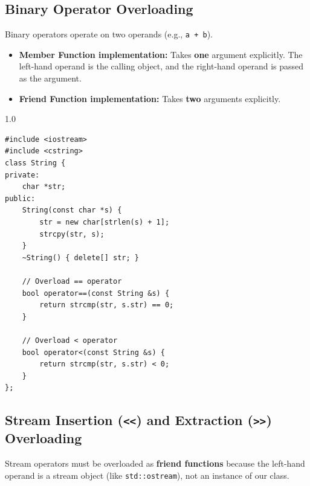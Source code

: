 \documentclass[12pt,a4paper]{article}
\begin{document}
\subsection{Binary Operator Overloading}
Binary operators operate on two operands (e.g., \texttt{a + b}).
\begin{itemize}[leftmargin=*, itemsep=3pt]
  \item \textbf{Member Function implementation:} Takes \textbf{one} argument explicitly. The left-hand operand is the calling object, and the right-hand operand is passed as the argument.
  \item \textbf{Friend Function implementation:} Takes \textbf{two} arguments explicitly.
\end{itemize}

\begin{tcolorbox}[examplebox, title={Code Example: Relational operator overloading for custom strings}]
\begin{spacing}{1.0}
\begin{verbatim}
#include <iostream>
#include <cstring>
class String {
private:
    char *str;
public:
    String(const char *s) {
        str = new char[strlen(s) + 1];
        strcpy(str, s);
    }
    ~String() { delete[] str; }
    
    // Overload == operator
    bool operator==(const String &s) {
        return strcmp(str, s.str) == 0;
    }
    
    // Overload < operator
    bool operator<(const String &s) {
        return strcmp(str, s.str) < 0;
    }
};
\end{verbatim}
\end{spacing}
\end{tcolorbox}

\subsection{Stream Insertion (\texttt{<<}) and Extraction (\texttt{>>}) Overloading}
Stream operators must be overloaded as \textbf{friend functions} because the left-hand operand is a stream object (like \texttt{std::ostream}), not an instance of our class.
\end{document}
